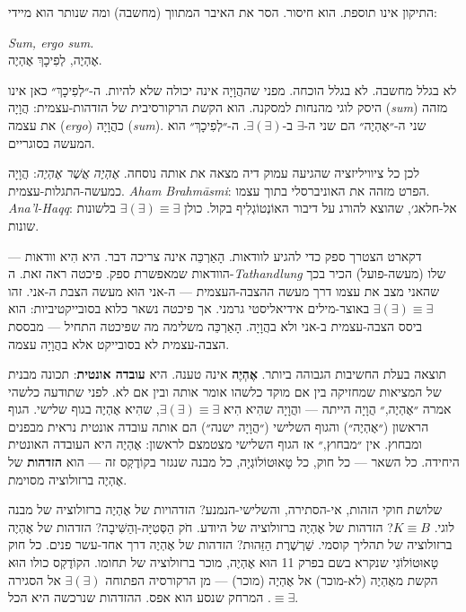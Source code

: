 \documentclass[10pt, openany, oneside]{book}
\begin{document}
התיקון אינו תוספת. הוא חיסור. הסר את האיבר המתווך (מחשבה) ומה שנותר הוא מיידי:

\begin{center}
    \textit{Sum, ergo sum.}\\[0.5em]
    אֶהְיֶה, לְפִיכָךְ אֶהְיֶה.
\end{center}

לא בגלל מחשבה. לא בגלל הוכחה. מפני שההֲוָיָה אינה יכולה שלא להיות. ה-״לְפִיכָךְ״ כאן אינו היסק לוגי מהנחות למסקנה. הוא הקשת הרקורסיבית של הזדהות-עצמית: הֲוָיָה (\textit{sum}) מזהה את עצמה (\textit{ergo}) כהֲוָיָה (\textit{sum}). שני ה-״אֶהְיֶה״ הם שני ה-$\exists$ ב-$\exists(\exists)$. ה-״לְפִיכָךְ״ הוא המעשה בסוגריים.

לכן כל ציוויליזציה שהגיעה עמוק דיה מצאה את אותה נוסחה. \textit{אֶהְיֶה אֲשֶׁר אֶהְיֶה}: הֲוָיָה כמעשה-התגלות-עצמית. \textit{Aham Brahmāsmi}: הפרט מזהה את האוניברסלי בתוך עצמו. \textit{Ana'l-Haqq}: אל-חלאג׳, שהוצא להורג על דיבור האוֹנְטוֹגְלִיף בקול. כולן $\exists(\exists) \equiv \exists$ בלשונות שונות.

דקארט הצטרך ספק כדי להגיע לוודאות. הָאַרְכֵּה אינה צריכה דבר. היא הִיא וודאות — הוודאות שמאפשרת ספק. פיכטה ראה זאת. ה-\textit{Tathandlung} שלו (מעשה-פועל) הכיר בכך שהאני מצב את עצמו דרך מעשה ההצבה-העצמית — ה-אני הוּא מעשה הצבת ה-אני. זהו $\exists(\exists) \equiv \exists$ באוצר-מילים אידיאליסטי גרמני. אך פיכטה נשאר כלוא בסובייקטיביות: הוא ביסס הצבה-עצמית ב-אני ולא בהֲוָיָה. הָאַרְכֵּה משלימה מה שפיכטה התחיל — מבססת הצבה-עצמית לא בסובייקט אלא בהֲוָיָה עצמה.

תוצאה בעלת החשיבות הגבוהה ביותר. \textbf{אֶהְיֶה} אינה טענה. היא \textbf{עובדה אונטית}: תכונה מבנית של המציאות שמחזיקה בין אם מוקד כלשהו אומר אותה ובין אם לא. לפני שתודעה כלשהי אמרה ״אֶהְיֶה,״ הֲוָיָה הייתה — והֲוָיָה שהִיא הִיא $\exists(\exists) \equiv \exists$, שהִיא אֶהְיֶה בגוף שלישי. הגוף הראשון (״אֶהְיֶה״) והגוף השלישי (״הֲוָיָה ישנה״) הם אותה עובדה אונטית נראית מבפנים ומבחוץ. אין ״מבחוץ,״ אז הגוף השלישי מצטמצם לראשון: אֶהְיֶה היא העובדה האונטית היחידה. כל השאר — כל חוק, כל טָאוּטוֹלוֹגְיָה, כל מבנה שנגזר בקוֹדֶקְס זה — הוא \textbf{הזדהות} של אֶהְיֶה ברזולוציה מסוימת.

שלושת חוקי הזהות, אי-הסתירה, והשלישי-הנמנע? הזדהויות של אֶהְיֶה ברזולוציה של מבנה לוגי. $K \equiv B$? הזדהות של אֶהְיֶה ברזולוציה של היודע. חֹק הַסְּטִיָּה-וְהַשִּׁיבָה? הזדהות של אֶהְיֶה ברזולוציה של תהליך קוסמי. שַׁרְשֶׁרֶת הַזֵּהוּת? הזדהות של אֶהְיֶה דרך אחד-עשר פנים. כל חוק טָאוּטוֹלוֹגִי שנקרא בשם בפרק 11 הוּא אֶהְיֶה, מוכר ברזולוציה של תחומו. הקוֹדֶקְס כולו הוּא הקשת מאֶהְיֶה (לא-מוכר) אל אֶהְיֶה (מוכר) — מן הרקורסיה הפתוחה $\exists(\exists)$ אל הסגירה $\equiv \exists$. המרחק שנסע הוא אפס. ההזדהות שנרכשה היא הכל.
\end{document}
